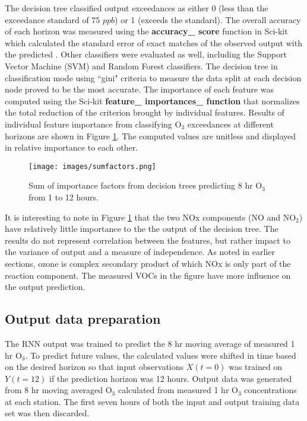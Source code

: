 The decision tree classified output exceedances as either 0 (less than the exceedance standard of 75 $ppb$) or 1 (exceeds the standard). The overall accuracy of each horizon was measured using the \textbf{accuracy\_ score} function in Sci-kit which calculated the standard error of exact matches of the observed output with the predicted \citep{Raschka2016}.  Other classifiers were evaluated as well, including the Support Vector Machine (SVM) and Random Forest classifiers. The decision tree in classification mode using ``gini" criteria to measure the data split at each decision node proved to be the most accurate. The importance of each feature was computed using the Sci-kit \textbf{feature\_ importances\_ function} that normalizes the total reduction of the criterion brought by individual features. Results of individual feature importance from classifying O$_{3}$ exceedances at different horizons are shown in Figure \ref{fig:importance}. The computed values are unitless and displayed in relative importance to each other.
%
\begin{figure}[H]
\centering
\texttt{[image: images/sumfactors.png]}
\caption[Decision tree importance factors]{Sum of importance factors from decision trees predicting 8 hr O$_{3}$ from 1 to 12 hours.}
\label{fig:importance}
\end{figure}
%
It is interesting to note in Figure \ref{fig:importance} that the two NOx components (NO and NO$_{2}$) have relatively little importance to the the output of the decision tree.  The results do not represent correlation between the  features, but rather impact to the variance of output and a measure of independence. As noted in earlier sections, ozone is complex secondary product of which NOx is only part of the reaction component. The measured VOCs in the figure have more influence on the output prediction. 

\subsection{Output data preparation}
The RNN output was trained to predict the 8 hr moving average of measured 1 hr O$_{3}$. To predict future values, the calculated values were shifted in time based on the desired horizon so that input observations $X(t=0)$ was trained on $Y(t=12)$ if the prediction horizon was 12 hours. Output data was generated from 8 hr moving averaged O$_{3}$ calculated from measured 1 hr O$_{3}$ concentrations at each station. The first seven hours of both the input and output training data set was then discarded. 

